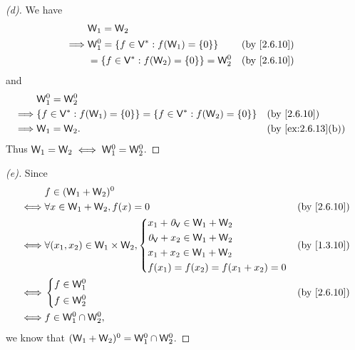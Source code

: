 \begin{proof}[(d)]
	We have
	\begin{align*}
		         & \W_1 = \W_2                                                      \\
		\implies & \W_1^0 = \set{f \in \V^* : f(\W_1) = \set{0}}   &  & \by{2.6.10} \\
		         & = \set{f \in \V^* : f(\W_2) = \set{0}} = \W_2^0 &  & \by{2.6.10} \\
	\end{align*}
	and
	\begin{align*}
		         & \W_1^0 = \W_2^0                                                                                    \\
		\implies & \set{f \in \V^* : f(\W_1) = \set{0}} = \set{f \in \V^* : f(\W_2) = \set{0}} &  & \by{2.6.10}       \\
		\implies & \W_1 = \W_2.                                                                &  & \by{ex:2.6.13}[b]
	\end{align*}
	Thus \(\mathsf{W}_1 = \mathsf{W}_2 \iff \mathsf{W}_1^0 = \mathsf{W}_2^0\).
\end{proof}

\begin{proof}[(e)]
	Since
	\begin{align*}
		     & f \in (\W_1 + \W_2)^0                                                      \\
		\iff & \forall x \in \W_1 + \W_2, f(x) = 0                     &  & \by{2.6.10}   \\
		\iff & \forall (x_1, x_2) \in \W_1 \times \W_2, \begin{dcases}
			                                                x_1 + \zv_{\V} \in \W_1 + \W_2 \\
			                                                \zv_{\V} + x_2 \in \W_1 + \W_2 \\
			                                                x_1 + x_2 \in \W_1 + \W_2      \\
			                                                f(x_1) = f(x_2) = f(x_1 + x_2) = 0
		                                                \end{dcases} &  & \by{1.3.10} \\
		\iff & \begin{dcases}
			       f \in \W_1^0 \\
			       f \in \W_2^0
		       \end{dcases}                                         &  & \by{2.6.10}      \\
		\iff & f \in \W_1^0 \cap \W_2^0,
	\end{align*}
	we know that \((\mathsf{W}_1 + \mathsf{W}_2)^0 = \mathsf{W}_1^0 \cap \mathsf{W}_2^0\).
\end{proof}

